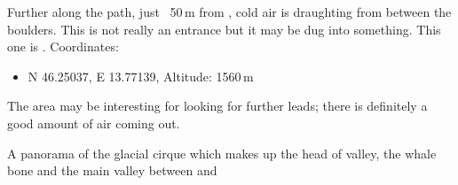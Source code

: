 Further along the path, just ~50\,m from , cold air is draughting from between the boulders. This is not really an entrance but it may be dug into something. This one is . Coordinates:

\begin{itemize}
	\item N 46.25037, E 13.77139,  Altitude: 1560\,m
\end{itemize}

The area may be interesting for looking for further leads; there is definitely a good amount of air coming out.


\begin{pagefigure}
      \checkoddpage \ifoddpage \forcerectofloat \else \forceversofloat \fi
      \centering
       \label{Panorama}
  \caption{ A  panorama of the glacial cirque which makes up the head of  valley, the whale bone and the main valley between  and  }
\end{pagefigure}
